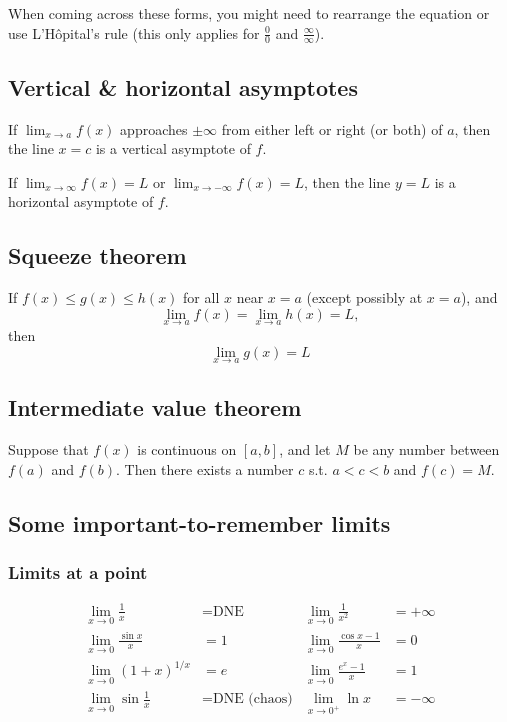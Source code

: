 \documentclass[main.tex]{subfiles}
\begin{document}
\begin{multicols}{2}
	When coming across these forms, you might need to rearrange the equation or use L'Hôpital's rule (this only applies for \(\frac{0}{0}\) and \(\frac{\infty}{\infty}\)).

	\subsection*{Vertical \& horizontal asymptotes}
	\begin{definition}
		If \(\lim_{x \to a}{f(x)}\) approaches \(\pm \infty\) from either left or right (or both) of \(a\), then the line \(x = c\) is a vertical asymptote of \(f\).
	\end{definition}
	\begin{definition}
		If \(\lim_{x \to \infty}{f(x)} = L\) or \(\lim_{x \to -\infty}{f(x)} = L\), then the line \(y = L\) is a horizontal asymptote of \(f\).
	\end{definition}


	\subsection*{Squeeze theorem}
	\begin{theorem}
	If \(f(x) \leq g(x) \leq h(x)\) for all \(x\) near \(x = a\) (except possibly at \(x = a\)), and
	\[\lim_{x \to a}{f(x)} = \lim_{x \to a}{h(x)} = L,\] then \[\lim_{x \to a}{g(x)} = L\]
	\end{theorem}

	\subsection*{Intermediate value theorem}
	\begin{theorem}
	Suppose that \(f(x)\) is continuous on \([a, b]\), and let \(M\) be any number between \(f(a)\) and \(f(b)\). Then there exists a number \(c\) s.t. \(a < c < b\) and \(f(c) = M\).
	\end{theorem}

	\subsection*{Some important-to-remember limits}
	\subsubsection*{Limits at a point}
	\begin{align*}  %
		\lim_{x \to 0} \frac{1}{x} &= \text{DNE} & \lim_{x \to 0} \frac{1}{x^2} &= +\infty \\
		\lim_{x \to 0} \frac{\sin{x}}{x} &= 1 & \lim_{x \to 0} \frac{\cos{x} - 1}{x} &= 0 \\
		\lim_{x \to 0} (1 + x)^{1/x} &= e & \lim_{x \to 0} \frac{e^x - 1}{x} &= 1 \\
		\lim_{x \to 0} \sin{\frac{1}{x}} &= \text{DNE (chaos)} & \lim_{x \to 0^{+}} \ln{x} &= -\infty
	\end{align*}

\end{multicols}
\end{document}
